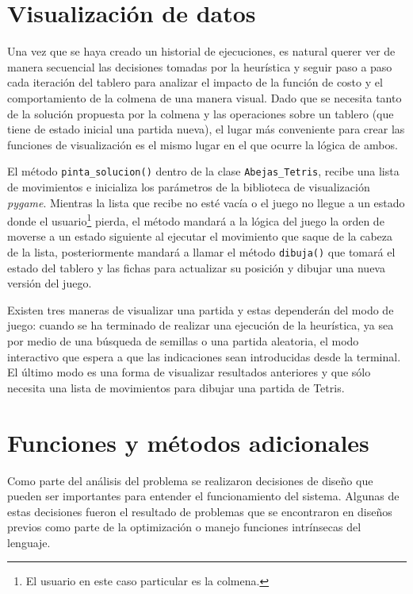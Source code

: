 \section{Visualización de datos}

Una vez que se haya creado un historial de ejecuciones, es natural querer 
ver de manera secuencial las decisiones tomadas por la heurística y seguir paso 
a paso cada iteración del tablero para analizar el impacto de la función de costo 
y el comportamiento de la colmena de una manera visual. Dado que se necesita tanto de la solución 
propuesta por la colmena y las operaciones sobre un tablero (que tiene de estado 
inicial una partida nueva), el lugar más conveniente para crear las funciones 
de visualización es el mismo lugar en el que ocurre la lógica de ambos.

El método \texttt{pinta\_solucion()} dentro de la clase \texttt{Abejas\_Tetris}, 
recibe una lista de movimientos e inicializa los parámetros de la biblioteca 
de visualización \textit{pygame}. Mientras la lista que recibe no esté vacía o el 
juego no llegue a un estado donde el usuario\footnote{El usuario en este 
caso particular es la colmena.} pierda, el método 
mandará a la lógica del juego la orden de moverse a un estado siguiente al ejecutar 
el movimiento que saque de la cabeza de la lista, posteriormente mandará a 
llamar el método \texttt{dibuja()} que tomará el estado del tablero y las fichas 
para actualizar su posición y dibujar una nueva versión del juego.



Existen tres maneras de visualizar una partida y estas dependerán del modo 
de juego: cuando se ha terminado de realizar una ejecución de la heurística, ya sea por 
medio de una búsqueda de semillas o una partida aleatoria, el modo interactivo 
que espera a que las indicaciones sean introducidas desde la terminal. El último modo 
es una forma de visualizar resultados anteriores y que sólo necesita una lista 
de movimientos para dibujar una partida de Tetris.


\section{Funciones y métodos adicionales}

Como parte del análisis del problema se realizaron decisiones de diseño 
que pueden ser importantes para entender el funcionamiento del sistema. 
Algunas de estas decisiones fueron el resultado de problemas que se encontraron 
en diseños previos como parte de la optimización o manejo funciones intrínsecas 
del lenguaje.

